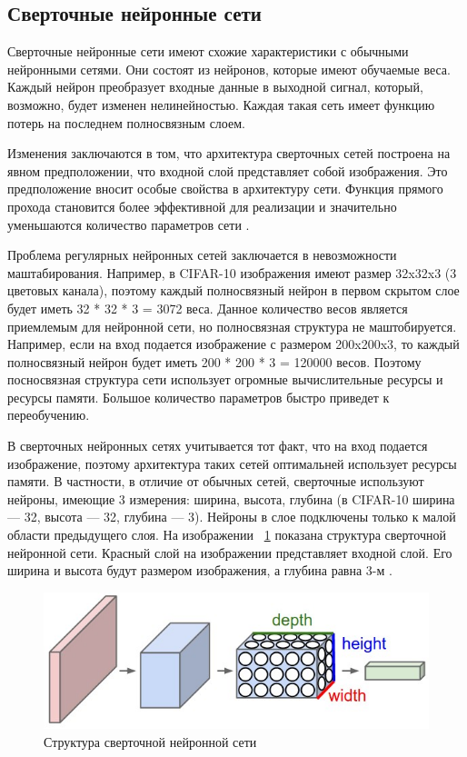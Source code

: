 \documentclass[a4paper,english,russian]{G2-105}
\begin{document}
\subsection{Сверточные нейронные сети}
\par Сверточные нейронные сети имеют схожие характеристики с обычными нейронными сетями. Они состоят из нейронов, которые имеют обучаемые веса. Каждый нейрон преобразует входные данные в выходной сигнал, который, возможно, будет изменен нелинейностью. Каждая такая сеть имеет функцию потерь на последнем полносвязным слоем.
\par Изменения заключаются в том, что архитектура сверточных сетей построена на явном предположении, что входной слой представляет собой изображения. Это предположение вносит особые свойства в архитектуру сети. Функция прямого прохода становится более эффективной для реализации и значительно уменьшаются количество параметров сети \cite{8}.
\par Проблема регулярных нейронных сетей заключается в невозможности маштабирования. Например, в CIFAR-10 изображения имеют размер 32x32x3 (3 цветовых канала), поэтому каждый полносвязный нейрон в первом скрытом слое будет иметь 32 * 32 * 3 = 3072 веса. Данное количество весов является приемлемым для нейронной сети, но полносвязная структура не маштобируется. Например, если на вход подается изображение с размером 200x200x3, то каждый полносвязный нейрон будет иметь 200 * 200 * 3 = 120000 весов. Поэтому посносвязная структура сети использует огромные вычислительные ресурсы и ресурсы памяти. Большое количество параметров быстро приведет к переобучению.
\par В сверточных нейронных сетях учитывается тот факт, что на вход подается изображение, поэтому архитектура таких сетей оптимальней использует ресурсы памяти. В частности, в отличие от обычных сетей, сверточные используют нейроны, имеющие 3 измерения: ширина, высота, глубина (в CIFAR-10 ширина --- 32, высота --- 32, глубина --- 3). Нейроны в слое подключены только к малой области предыдущего слоя. На изображении ~\ref{convnn} показана структура сверточной нейронной сети. Красный слой на изображении представляет входной слой. Его ширина и высота будут размером изображения, а глубина равна 3-м \cite{9}.
\begin{figure}
    \includegraphics[width=\linewidth]{convnn.png}
    \caption{Структура сверточной нейронной сети}
	\label{convnn}
\end{figure}
\end{document}
